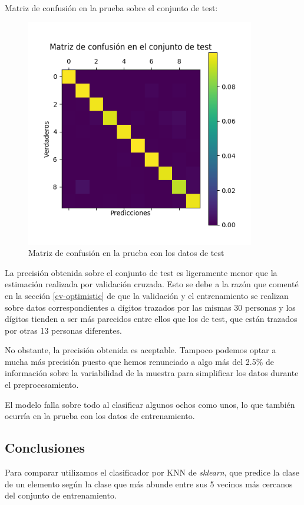 \documentclass[a4]{article}
\begin{document}
Matriz de confusión en la prueba sobre el conjunto de test:
\vspace{-4mm}
\begin{figure}[H]
  \centering
  \includegraphics[width=100mm]{imgs/conf-test.png}
  \caption{Matriz de confusión en la prueba con los datos de test}
  \label{fig:conf-test}
\end{figure}
\vspace{-4mm}

La precisión obtenida sobre el conjunto de test es ligeramente menor
que la estimación realizada por validación cruzada. Esto se debe a la
razón que comenté en la sección \ref{cv-optimistic} de que la
validación y el entrenamiento se realizan sobre datos correspondientes
a dígitos trazados por las mismas 30 personas y los dígitos tienden a
ser más parecidos entre ellos que los de test, que están trazados por
otras 13 personas diferentes.

No obstante, la precisión obtenida es aceptable. Tampoco podemos
optar a mucha más precisión puesto que hemos renunciado a algo más del
2.5\% de información sobre la variabilidad de la muestra para
simplificar los datos durante el preprocesamiento.

El modelo falla sobre todo al clasificar algunos ochos como unos, lo
que también ocurría en la prueba con los datos de entrenamiento.

\subsection{Conclusiones}

Para comparar utilizamos el clasificador por KNN de
\textit{sklearn}, que predice la clase de un elemento según la clase
que más abunde entre sus 5 vecinos más cercanos del conjunto de
entrenamiento.
\end{document}
